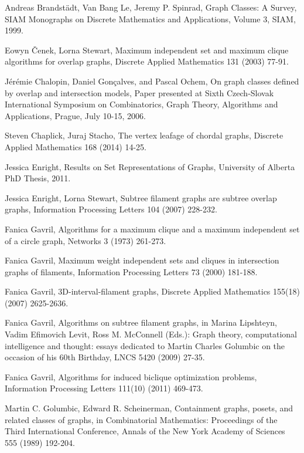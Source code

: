\documentclass[
final
]{dmtcs-episciences}        \usepackage{graphics, amsthm, amsmath, amssymb, algorithm, algorithmic}
\begin{document}
\begin{thebibliography}{99}

Andreas Brandst\"adt, Van Bang Le, Jeremy P. Spinrad,
Graph Classes: A Survey, SIAM Monographs on Discrete Mathematics and Applications, Volume 3, SIAM, 1999.

Eowyn \v{C}enek, Lorna Stewart, 
Maximum independent set and maximum clique
algorithms for overlap graphs, 
Discrete Applied Mathematics 131 (2003) 77-91.

J\'er\'emie Chalopin, Daniel Gon\c{c}alves, and Pascal Ochem,
On graph classes defined by overlap and intersection models, Paper presented at
Sixth Czech-Slovak International Symposium on Combinatorics, Graph Theory, Algorithms and Applications, Prague, July 10-15, 2006.

Steven Chaplick, Juraj Stacho,
The vertex leafage of chordal graphs,
Discrete Applied Mathematics 168 (2014) 14-25.

Jessica Enright, 
Results on Set Representations of Graphs, University of Alberta PhD Thesis, 2011.

Jessica Enright, Lorna Stewart, 
Subtree filament graphs are subtree overlap graphs, 
Information Processing Letters 104 (2007) 228-232.

Fanica Gavril, 
Algorithms for a maximum clique and a maximum independent set of a circle graph, 
Networks 3 (1973) 261-273.

Fanica Gavril, 
Maximum weight independent sets and cliques in
intersection graphs of filaments, 
Information Processing Letters 73 (2000) 181-188.

Fanica Gavril, 
3D-interval-filament graphs,
Discrete Applied Mathematics 155(18) (2007) 2625-2636.

Fanica Gavril, 
Algorithms on subtree filament graphs,
in Marina Lipshteyn, Vadim Efimovich Levit, Ross M. McConnell (Eds.): Graph theory, computational intelligence and thought: essays dedicated to Martin Charles Golumbic on the occasion of his 60th Birthday, LNCS 5420 (2009) 27-35.

Fanica Gavril, 
Algorithms for induced biclique optimization problems, 
Information Processing Letters 111(10) (2011) 469-473.

Martin C. Golumbic, Edward R. Scheinerman, Containment graphs, posets,
and related classes of graphs, in Combinatorial Mathematics:
Proceedings of the Third International Conference, 
Annals of the New York Academy of Sciences 555 (1989) 192-204.


\end{thebibliography}
\end{document}
